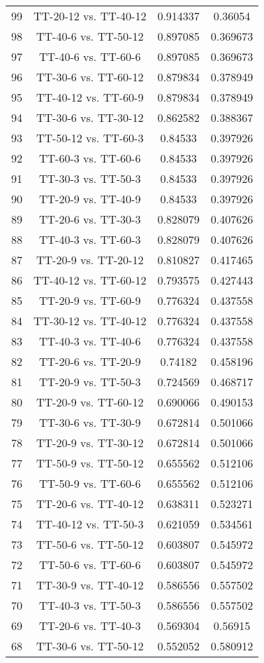 \documentclass[a4paper,10pt]{article}
\begin{document}
\begin{landscape}
\begin{table}[!htp]
\begin{tabular}{cccc}
99&TT-20-12 vs. TT-40-12&0.914337&0.36054\\
98&TT-40-6 vs. TT-50-12&0.897085&0.369673\\
97&TT-40-6 vs. TT-60-6&0.897085&0.369673\\
96&TT-30-6 vs. TT-60-12&0.879834&0.378949\\
95&TT-40-12 vs. TT-60-9&0.879834&0.378949\\
94&TT-30-6 vs. TT-30-12&0.862582&0.388367\\
93&TT-50-12 vs. TT-60-3&0.84533&0.397926\\
92&TT-60-3 vs. TT-60-6&0.84533&0.397926\\
91&TT-30-3 vs. TT-50-3&0.84533&0.397926\\
90&TT-20-9 vs. TT-40-9&0.84533&0.397926\\
89&TT-20-6 vs. TT-30-3&0.828079&0.407626\\
88&TT-40-3 vs. TT-60-3&0.828079&0.407626\\
87&TT-20-9 vs. TT-20-12&0.810827&0.417465\\
86&TT-40-12 vs. TT-60-12&0.793575&0.427443\\
85&TT-20-9 vs. TT-60-9&0.776324&0.437558\\
84&TT-30-12 vs. TT-40-12&0.776324&0.437558\\
83&TT-40-3 vs. TT-40-6&0.776324&0.437558\\
82&TT-20-6 vs. TT-20-9&0.74182&0.458196\\
81&TT-20-9 vs. TT-50-3&0.724569&0.468717\\
80&TT-20-9 vs. TT-60-12&0.690066&0.490153\\
79&TT-30-6 vs. TT-30-9&0.672814&0.501066\\
78&TT-20-9 vs. TT-30-12&0.672814&0.501066\\
77&TT-50-9 vs. TT-50-12&0.655562&0.512106\\
76&TT-50-9 vs. TT-60-6&0.655562&0.512106\\
75&TT-20-6 vs. TT-40-12&0.638311&0.523271\\
74&TT-40-12 vs. TT-50-3&0.621059&0.534561\\
73&TT-50-6 vs. TT-50-12&0.603807&0.545972\\
72&TT-50-6 vs. TT-60-6&0.603807&0.545972\\
71&TT-30-9 vs. TT-40-12&0.586556&0.557502\\
70&TT-40-3 vs. TT-50-3&0.586556&0.557502\\
69&TT-20-6 vs. TT-40-3&0.569304&0.56915\\
68&TT-30-6 vs. TT-50-12&0.552052&0.580912\\

\end{tabular}
\end{table}
\end{landscape}
\end{document}
